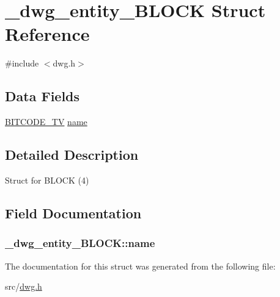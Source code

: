 \hypertarget{struct__dwg__entity__BLOCK}{\section{\-\_\-dwg\-\_\-entity\-\_\-\-B\-L\-O\-C\-K \-Struct \-Reference}
\label{struct__dwg__entity__BLOCK}
}


{\ttfamily \#include $<$dwg.\-h$>$}

\subsection*{\-Data \-Fields}
\begin{DoxyCompactItemize}
\item 
\hyperlink{dwg_8h_a2a7e040c6e36ca039b03608679ecaf7c}{\-B\-I\-T\-C\-O\-D\-E\-\_\-\-T\-V} \hyperlink{struct__dwg__entity__BLOCK_a4987797e334081fd4502815d632fe91f}{name}
\end{DoxyCompactItemize}


\subsection{\-Detailed \-Description}
\-Struct for \-B\-L\-O\-C\-K (4) 

\subsection{\-Field \-Documentation}
\hypertarget{struct__dwg__entity__BLOCK_a4987797e334081fd4502815d632fe91f}{
\subsubsection[{name}]{ {\bf \-\_\-dwg\-\_\-entity\-\_\-\-B\-L\-O\-C\-K\-::name}}}\label{struct__dwg__entity__BLOCK_a4987797e334081fd4502815d632fe91f}


\-The documentation for this struct was generated from the following file\-:\begin{DoxyCompactItemize}
\item 
src/\hyperlink{dwg_8h}{dwg.\-h}\end{DoxyCompactItemize}
